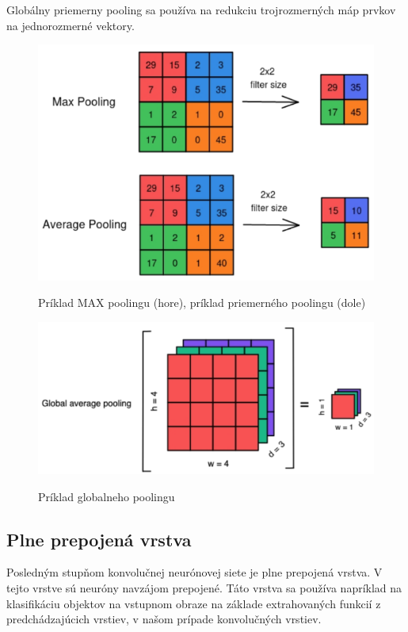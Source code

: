 Globálny priemerny pooling sa používa na redukciu trojrozmerných máp prvkov na jednorozmerné vektory.

\begin{figure}[H]
  \includegraphics{images/pooling.png}\label{img:max_pooling}
  \caption{Príklad MAX poolingu (hore), príklad priemerného poolingu (dole)}
\end{figure}

\begin{figure}[H]
  \includegraphics{images/global_pooling.png}\label{img:global_pooling}
  \caption{Príklad globalneho poolingu}
\end{figure}

\subsection{Plne prepojená vrstva}\label{subsec:plne_prepojena_vrstva}

Posledným stupňom konvolučnej neurónovej siete je plne prepojená vrstva. V tejto
vrstve sú neuróny navzájom prepojené. Táto vrstva sa používa napríklad na
klasifikáciu objektov na vstupnom obraze na základe extrahovaných funkcií z
predchádzajúcich vrstiev, v našom prípade konvolučných vrstiev.



